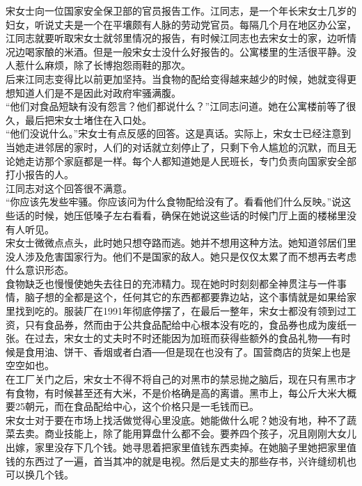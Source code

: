\begin{multicols}{\theparacolNo}
宋女士向一位国家安全保卫部的官员报告工作。江同志，是一个年长宋女士几岁的妇女，听说丈夫是一个在平壤颇有人脉的劳动党官员。每隔几个月在地区办公室，江同志就要听取宋女士就邻里情况的报告，有时候江同志也去宋女士的家，边听情况边喝家酿的米酒。但是一般宋女士没什么好报告的。公寓楼里的生活很平静。没人惹什么麻烦，除了长博抱怨雨鞋的那次。\\

后来江同志变得比以前更加坚持。当食物的配给变得越来越少的时候，她就变得更想知道人们是不是因此对政府牢骚满腹。\\

“他们对食品短缺有没有怨言？他们都说什么？”江同志问道。她在公寓楼前等了很久，最后把宋女士堵住在入口处。\\

“他们没说什么。”宋女士有点反感的回答。这是真话。实际上，宋女士已经注意到当她走进邻居的家时，人们的对话就立刻停止了，只剩下令人尴尬的沉默，而且无论她走访那个家庭都是一样。每个人都知道她是人民班长，专门负责向国家安全部打小报告的人。\\

江同志对这个回答很不满意。\\

“你应该先发些牢骚。你应该问为什么食物配给没有了。看看他们什么反映。”说这些话的时候，她压低嗓子左右看看，确保在她说这些话的时候门厅上面的楼梯里没有人听见。\\

宋女士微微点点头，此时她只想夺路而逃。她并不想用这种方法。她知道邻居们里没人涉及危害国家行为。他们不是国家的敌人。她只是仅仅太累了而不想再去考虑什么意识形态。\\

食物缺乏也慢慢使她失去往日的充沛精力。现在她时时刻刻都全神贯注与一件事情，脑子想的全都是这个，任何其它的东西都都要靠边站，这个事情就是如果给家里找到吃的。服装厂在1991年彻底停摆了，在最后一整年，宋女士都没有领到过工资，只有食品券，然而由于公共食品配给中心根本没有吃的，食品券也成为废纸一张。在过去，宋女士的丈夫时不时还能因为加班而获得些额外的食品礼物──有时候是食用油、饼干、香烟或者白酒──但是现在也没有了。国营商店的货架上也是空空如也。\\

在工厂关门之后，宋女士不得不将自己的对黑市的禁忌抛之脑后，现在只有黑市才有食物，有时候甚至还有大米，不是价格确是高的离谱。黑市上，每公斤大米大概要25朝元，而在食品配给中心，这个价格只是一毛钱而已。\\

宋女士对于要在市场上找活做觉得心里没底。她能做什么呢？她没有地，种不了蔬菜去卖。商业技能上，除了能用算盘什么都不会。要养四个孩子，况且刚刚大女儿出嫁，家里没存下几个钱。她寻思着把家里值钱东西卖掉。在她脑子里她把家里值钱的东西过了一遍，首当其冲的就是电视。然后是丈夫的那些存书，兴许缝纫机也可以换几个钱。\\


\end{multicols}
